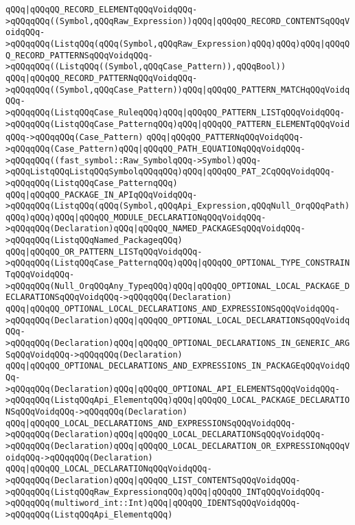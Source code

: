 \verb|qQQq|\verb#|qQQqQQ_RECORD_ELEMENTqQQqVoidqQQq->qQQqqQQq((Symbol,qQQqRaw_Expression))qQQq|qQQqQQ_RECORD_CONTENTSqQQqVoidqQQq->qQQqqQQq(ListqQQq(qQQq(Symbol,qQQqRaw_Expression)qQQq)qQQq)qQQq|qQQqQQ_RECORD_PATTERNSqQQqVoidqQQq->qQQqqQQq((ListqQQq((Symbol,qQQqCase_Pattern)),qQQqBool))#\newline
\verb|qQQq|\verb#|qQQqQQ_RECORD_PATTERNqQQqVoidqQQq->qQQqqQQq((Symbol,qQQqCase_Pattern))qQQq|qQQqQQ_PATTERN_MATCHqQQqVoidqQQq->qQQqqQQq(ListqQQqCase_RuleqQQq)qQQq|qQQqQQ_PATTERN_LISTqQQqVoidqQQq->qQQqqQQq(ListqQQqCase_PatternqQQq)qQQq|qQQqQQ_PATTERN_ELEMENTqQQqVoidqQQq->qQQqqQQq(Case_Pattern)#\newline
\verb|qQQq|\verb#|qQQqQQ_PATTERNqQQqVoidqQQq->qQQqqQQq(Case_Pattern)qQQq|qQQqQQ_PATH_EQUATIONqQQqVoidqQQq->qQQqqQQq((fast_symbol::Raw_SymbolqQQq->Symbol)qQQq->qQQqListqQQqListqQQqSymbolqQQqqQQq)qQQq|qQQqQQ_PAT_2CqQQqVoidqQQq->qQQqqQQq(ListqQQqCase_PatternqQQq)#\newline
\verb|qQQq|\verb#|qQQqQQ_PACKAGE_IN_APIqQQqVoidqQQq->qQQqqQQq(ListqQQq(qQQq(Symbol,qQQqApi_Expression,qQQqNull_OrqQQqPath)qQQq)qQQq)qQQq|qQQqQQ_MODULE_DECLARATIONqQQqVoidqQQq->qQQqqQQq(Declaration)qQQq|qQQqQQ_NAMED_PACKAGESqQQqVoidqQQq->qQQqqQQq(ListqQQqNamed_PackageqQQq)#\newline
\verb|qQQq|\verb#|qQQqQQ_OR_PATTERN_LISTqQQqVoidqQQq->qQQqqQQq(ListqQQqCase_PatternqQQq)qQQq|qQQqQQ_OPTIONAL_TYPE_CONSTRAINTqQQqVoidqQQq->qQQqqQQq(Null_OrqQQqAny_TypeqQQq)qQQq|qQQqQQ_OPTIONAL_LOCAL_PACKAGE_DECLARATIONSqQQqVoidqQQq->qQQqqQQq(Declaration)#\newline
\verb|qQQq|\verb#|qQQqQQ_OPTIONAL_LOCAL_DECLARATIONS_AND_EXPRESSIONSqQQqVoidqQQq->qQQqqQQq(Declaration)qQQq|qQQqQQ_OPTIONAL_LOCAL_DECLARATIONSqQQqVoidqQQq->qQQqqQQq(Declaration)qQQq|qQQqQQ_OPTIONAL_DECLARATIONS_IN_GENERIC_ARGSqQQqVoidqQQq->qQQqqQQq(Declaration)#\newline
\verb|qQQq|\verb#|qQQqQQ_OPTIONAL_DECLARATIONS_AND_EXPRESSIONS_IN_PACKAGEqQQqVoidqQQq->qQQqqQQq(Declaration)qQQq|qQQqQQ_OPTIONAL_API_ELEMENTSqQQqVoidqQQq->qQQqqQQq(ListqQQqApi_ElementqQQq)qQQq|qQQqQQ_LOCAL_PACKAGE_DECLARATIONSqQQqVoidqQQq->qQQqqQQq(Declaration)#\newline
\verb|qQQq|\verb#|qQQqQQ_LOCAL_DECLARATIONS_AND_EXPRESSIONSqQQqVoidqQQq->qQQqqQQq(Declaration)qQQq|qQQqQQ_LOCAL_DECLARATIONSqQQqVoidqQQq->qQQqqQQq(Declaration)qQQq|qQQqQQ_LOCAL_DECLARATION_OR_EXPRESSIONqQQqVoidqQQq->qQQqqQQq(Declaration)#\newline
\verb|qQQq|\verb#|qQQqQQ_LOCAL_DECLARATIONqQQqVoidqQQq->qQQqqQQq(Declaration)qQQq|qQQqQQ_LIST_CONTENTSqQQqVoidqQQq->qQQqqQQq(ListqQQqRaw_ExpressionqQQq)qQQq|qQQqQQ_INTqQQqVoidqQQq->qQQqqQQq(multiword_int::Int)qQQq|qQQqQQ_IDENTSqQQqVoidqQQq->qQQqqQQq(ListqQQqApi_ElementqQQq)#\newline
